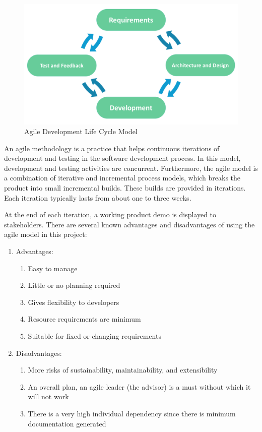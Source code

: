 \begin{figure}[htb]
\centering
\includegraphics[width=\textwidth]{section02/assets/agile.png}
\caption[Agile Development Life Cycle Model]{\label{fig:Agile Model}Agile Development Life Cycle Model}
\end{figure}

An agile methodology is a practice that helps continuous iterations of development and testing in the software development process. In this model, development and testing activities are concurrent. Furthermore, the agile model is a combination of iterative and incremental process models, which breaks the product into small incremental builds. These builds are provided in iterations. Each iteration typically lasts from about one to three weeks.

At the end of each iteration, a working product demo is displayed to stakeholders. There are several known advantages and disadvantages of using the agile model in this project:
\begin{enumerate}

  \item Advantages:
  \begin{enumerate}
    \item Easy to manage
    \item Little or no planning required
    \item Gives flexibility to developers
    \item Resource requirements are minimum
    \item Suitable for fixed or changing requirements
  \end{enumerate}

  \item Disadvantages:
  \begin{enumerate}
    \item More risks of sustainability, maintainability, and extensibility
    \item An overall plan, an agile leader (the advisor) is a must without which it will not work
    \item There is a very high individual dependency since there is minimum documentation generated
  \end{enumerate}

\end{enumerate}
